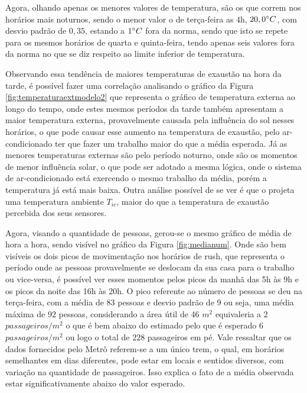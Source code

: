 \documentclass[acronym,symbols,table]{fei}
\begin{document}
Agora, olhando apenas os menores valores de temperatura, são os que correm nos horários mais noturnos, sendo o menor valor o de terça-feira as 4h, $20,0\space ^\circ C$, com desvio padrão de $0,35$, estando a $1 \space^\circ C$ fora da norma, sendo que isto se repete para os mesmos horários de quarta e quinta-feira, tendo apenas seis valores fora da norma no que se diz respeito ao limite inferior de temperatura. 

Observando essa tendência de maiores temperaturas de exaustão na hora da tarde, é possível fazer uma correlação analisando o gráfico da Figura \ref{fig:temperaturaextmodelo2} que representa o gráfico de temperatura externa ao longo do tempo, onde estes mesmos períodos da tarde também apresentam a maior temperatura externa, provavelmente causada pela influência do sol nesses horários, o que pode causar esse aumento na temperatura de exaustão, pelo ar-condicionado ter que fazer um trabalho maior do que a média esperada. Já as menores temperaturas externas são pelo período noturno, onde são os momentos de menor influência solar, o que pode ser adotado a mesma lógica, onde o sistema de ar-condicionado está exercendo o mesmo trabalho da média, porém a temperatura já está mais baixa. Outra análise possível de se ver é que o \textcite{metrosp2024} projeta uma temperatura ambiente ${T}_{ic}$, maior do que a temperatura de exaustão percebida dos seus sensores.



Agora, visando a quantidade de pessoas, gerou-se o mesmo gráfico de média de hora a hora, sendo visível no gráfico da Figura \ref{fig:medianum}. Onde são bem visíveis os dois picos de movimentação nos horários de rush, que representa o período onde as pessoas provavelmente se deslocam da sua casa para o trabalho ou vice-versa, é possível ver esses momentos pelos picos da manhã das 5h às 9h e os picos da noite das 16h às 20h. O pico referente ao número de pessoas se deu na terça-feira, com a média de $83$ pessoas e desvio padrão de $9$ ou seja, uma média máxima de $92$ pessoas, considerando a área útil de 46 $m^2$ equivaleria a $2$ $passageiros/m^2$ o que é bem abaixo do estimado pelo \textcite{metrosp2024} que é esperado $6$ $passageiros/m^2$ ou logo o total de $228$ passageiros em pé. Vale  ressaltar que os dados fornecidos pelo Metrô referem-se a um único trem, o qual, em  horários semelhantes em dias diferentes, pode estar em locais e sentidos diversos,  com variação na quantidade de passageiros. Isso explica o fato de a média observada  estar significativamente abaixo do valor esperado. %
\end{document}
